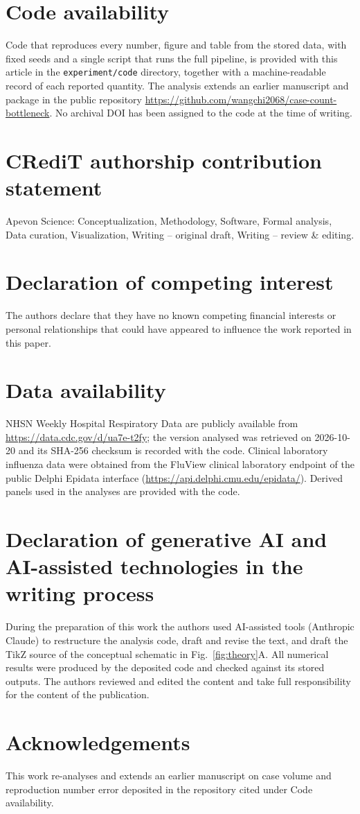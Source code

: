 \section*{Code availability}
Code that reproduces every number, figure and table from the stored data, with fixed seeds and a single script that runs the full pipeline, is provided with this article in the \texttt{experiment/code} directory, together with a machine-readable record of each reported quantity. The analysis extends an earlier manuscript and package in the public repository {\def\UrlBreaks{\do\/\do-}\url{https://github.com/wangchi2068/case-count-bottleneck}}. No archival DOI has been assigned to the code at the time of writing.

\section*{CRediT authorship contribution statement}
Apevon Science: Conceptualization, Methodology, Software, Formal analysis, Data curation, Visualization, Writing -- original draft, Writing -- review \& editing.

\section*{Declaration of competing interest}
The authors declare that they have no known competing financial interests or personal relationships that could have appeared to influence the work reported in this paper.

\section*{Data availability}
{\sloppy NHSN Weekly Hospital Respiratory Data are publicly available from \url{https://data.cdc.gov/d/ua7e-t2fy}; the version analysed was retrieved on 2026-10-20 and its SHA-256 checksum is recorded with the code. Clinical laboratory influenza data were obtained from the FluView clinical laboratory endpoint of the public Delphi Epidata interface (\mbox{\url{https://api.delphi.cmu.edu/epidata/}}). Derived panels used in the analyses are provided with the code.\par}

\section*{Declaration of generative AI and AI-assisted technologies in the writing process}
During the preparation of this work the authors used AI-assisted tools (Anthropic Claude) to restructure the analysis code, draft and revise the text, and draft the TikZ source of the conceptual schematic in Fig.~\ref{fig:theory}A. All numerical results were produced by the deposited code and checked against its stored outputs. The authors reviewed and edited the content and take full responsibility for the content of the publication.

\section*{Acknowledgements}
This work re-analyses and extends an earlier manuscript on case volume and reproduction number error deposited in the repository cited under Code availability.
